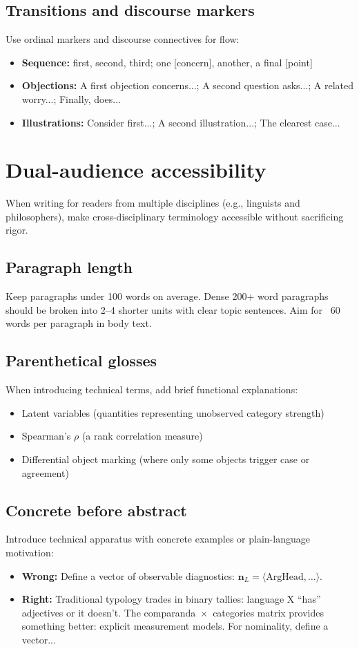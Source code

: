 \documentclass[12pt]{article}
\begin{document}
\subsection{Transitions and discourse markers}
Use ordinal markers and discourse connectives for flow:
\begin{itemize}[nosep]
  \item \textbf{Sequence:} first, second, third; one [concern], another, a final [point]
  \item \textbf{Objections:} A first objection concerns...; A second question asks...; A related worry...; Finally, does...
  \item \textbf{Illustrations:} Consider first...; A second illustration...; The clearest case...
\end{itemize}

\section{Dual-audience accessibility}\label{dual-audience}
When writing for readers from multiple disciplines (e.g., linguists and philosophers), make cross-disciplinary terminology accessible without sacrificing rigor.

\subsection{Paragraph length}
Keep paragraphs under 100 words on average. Dense 200+ word paragraphs should be broken into 2--4 shorter units with clear topic sentences. Aim for ~60 words per paragraph in body text.

\subsection{Parenthetical glosses}
When introducing technical terms, add brief functional explanations:
\begin{itemize}[nosep]
  \item Latent variables (quantities representing unobserved category strength)
  \item Spearman's $\rho$ (a rank correlation measure)
  \item Differential object marking (where only some objects trigger case or agreement)
\end{itemize}

\subsection{Concrete before abstract}
Introduce technical apparatus with concrete examples or plain-language motivation:
\begin{itemize}[nosep]
  \item \textbf{Wrong:} Define a vector of observable diagnostics: $\mathbf{n}_L = \langle \text{ArgHead}, \dots \rangle$.
  \item \textbf{Right:} Traditional typology trades in binary tallies: language X ``has'' adjectives or it doesn't. The comparanda~$\times$~categories matrix provides something better: explicit measurement models. For nominality, define a vector...
\end{itemize}
\end{document}
